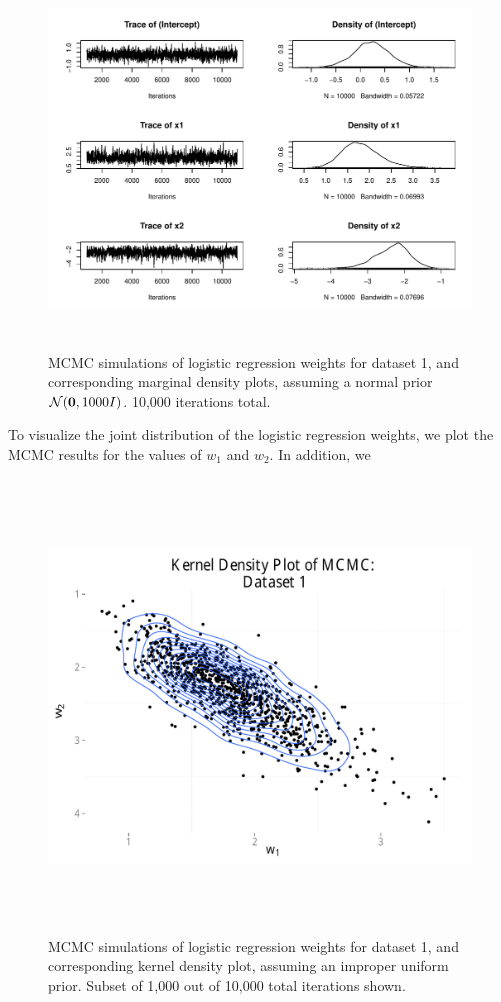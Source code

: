 \begin{figure}
\centering
	\includegraphics[height=100mm]{figures/mcmc_normal.pdf}
    \caption{MCMC simulations of logistic regression weights for dataset 1, and corresponding marginal density plots, assuming 
    a normal prior $\mathcal{N}(\boldsymbol{\mathbf{0}},1000I)$. 10,000 iterations total.}  \label{fig:mcmc_iterations_normal}  
\end{figure}

To visualize the joint distribution of the logistic regression weights, we plot the MCMC results for the values of $w_1$ and $w_2$.  In addition, we 



\begin{figure}
\centering
	\includegraphics[height=120mm]{figures/mcmc_uniform_2d.pdf}
    \caption{MCMC simulations of logistic regression weights for dataset 1, and corresponding kernel density plot, assuming 
    an improper uniform prior.  Subset of 1,000 out of 10,000 total iterations shown.}  \label{fig:mcmc_kernel}  
\end{figure}

